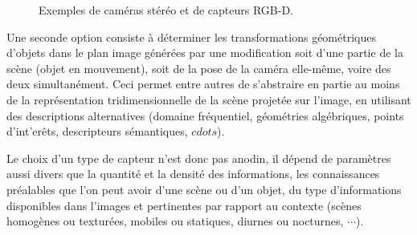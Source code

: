 \begin{figure}[!ht]
  \centering
\hfill
    \caption{\footnotesize{Exemples de cam\'eras st\'er\'eo et de capteurs RGB-D.}}
\label{chap01:fig02}
\end{figure}

Une seconde option consiste \`a d\'eterminer les transformations 
g\'eom\'etriques d'ob\-jets dans le plan image g\'en\'er\'ees par une 
modification soit d'une partie de la sc\`ene (objet en mouvement), soit de la 
pose de la cam\'era elle-m\^eme, voire des deux simultan\'ement. Ceci permet 
entre autres de s'abstraire en partie au moins de la repr\'esentation 
tridimensionnelle de la sc\`ene projet\'ee sur l'image, en utilisant des 
descriptions alternatives (domaine fr\'equentiel, g\'eom\'etries alg\'ebriques, 
points d'int'er\^ets, descripteurs s\'emantiques, $cdots$).

Le choix d'un type de capteur n'est donc pas anodin, il d\'epend de 
param\`etres aussi divers que la quantit\'e et la densit\'e des informations, 
les connaissances pr\'ealables que l'on peut avoir d'une sc\`ene ou d'un objet, 
du type d'informations disponibles dans l'images et pertinentes par rapport au 
contexte (sc\`enes homog\`enes ou textur\'ees, mobiles ou statiques, diurnes ou 
nocturnes, $\cdots$).

